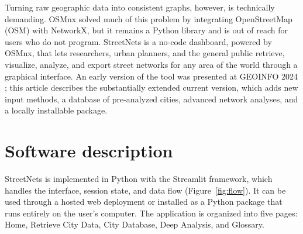 \documentclass[11pt, letterpaper]{article}
\begin{document}
Turning raw geographic data into consistent graphs, however, is technically demanding. OSMnx \cite{boeing2017osmnx, boeing2025osmnx} solved much of this problem by integrating OpenStreetMap (OSM) with NetworkX, but it remains a Python library and is out of reach for users who do not program. StreetNets is a no-code dashboard, powered by OSMnx, that lets researchers, urban planners, and the general public retrieve, visualize, analyze, and export street networks for any area of the world through a graphical interface. An early version of the tool was presented at GEOINFO 2024 \cite{streetnets_geoinfo2024}; this article describes the substantially extended current version, which adds new input methods, a database of pre-analyzed cities, advanced network analyses, and a locally installable package.

\section{Software description}

StreetNets is implemented in Python with the Streamlit framework, which handles the interface, session state, and data flow (Figure~\ref{fig:flow}). It can be used through a hosted web deployment or installed as a Python package that runs entirely on the user's computer. The application is organized into five pages: Home, Retrieve City Data, City Database, Deep Analysis, and Glossary.
\end{document}
